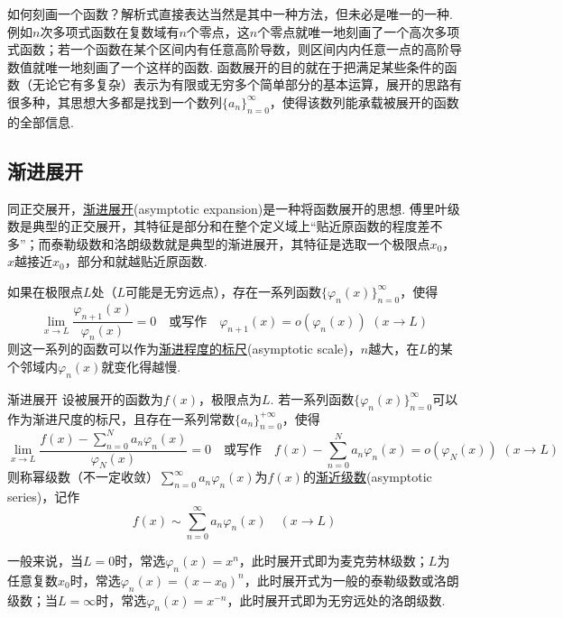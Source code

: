 \documentclass[main.tex]{subfiles}
\begin{document}
如何刻画一个函数？解析式直接表达当然是其中一种方法，但未必是唯一的一种. 例如\(n\)次多项式函数在复数域有\(n\)个零点，这\(n\)个零点就唯一地刻画了一个高次多项式函数；若一个函数在某个区间内有任意高阶导数，则区间内内任意一点的高阶导数值就唯一地刻画了一个这样的函数. 函数展开的目的就在于把满足某些条件的函数（无论它有多复杂）表示为有限或无穷多个简单部分的基本运算，展开的思路有很多种，其思想大多都是找到一个数列\(\{a_n\}_{n=0}^{\infty}\)，使得该数列能承载被展开的函数的全部信息.


\subsection{渐进展开}

同正交展开，\uline{渐进展开}(asymptotic expansion)是一种将函数展开的思想. 傅里叶级数是典型的正交展开，其特征是部分和在整个定义域上“贴近原函数的程度差不多”；而泰勒级数和洛朗级数就是典型的渐进展开，其特征是选取一个极限点\(x_0\)，\(x\)越接近\(x_0\)，部分和就越贴近原函数. 

如果在极限点\(L\)处（\(L\)可能是无穷远点），存在一系列函数\(\{\varphi_n(x)\}_{n=0}^{\infty}\)，使得
\[\lim_{x \to L} \frac{\varphi_{n+1}(x)}{\varphi_n(x)} = 0 \quad \mbox{或写作} \quad \varphi_{n+1}(x)=o(\varphi_n(x)) \,\, (x \to L)\]
则这一系列的函数可以作为\uline{渐进程度的标尺}(asymptotic scale)，\(n\)越大，在\(L\)的某个邻域内\(\varphi_n(x)\)就变化得越慢. 

\begin{definition}{渐进展开}
    设被展开的函数为\(f(x)\)，极限点为\(L\). 若一系列函数\(\{\varphi_n(x)\}_{n=0}^{\infty}\)可以作为渐进尺度的标尺，且存在一系列常数\(\{a_n\}_{n=0}^{+\infty}\)，使得
    \[\lim_{x \to L} \frac{f(x) - \displaystyle{\sum_{n=0}^{N}a_n\varphi_n(x)}}{\varphi_N(x)} = 0 \quad \mbox{或写作} \quad f(x) - \sum_{n=0}^{N}a_n\varphi_n(x) = o(\varphi_N(x)) \,\, (x \to L)\]
    则称幂级数（不一定收敛）\(\displaystyle{\sum_{n=0}^{\infty}a_n\varphi_n(x)}\)为\(f(x)\)的\uline{渐近级数}(asymptotic series)，记作
    \[f(x) \sim \sum_{n=0}^{\infty}a_n\varphi_n(x) \quad (x \to L)\]
\end{definition}

一般来说，当\(L=0\)时，常选\(\varphi_n(x)=x^n\)，此时展开式即为麦克劳林级数；\(L\)为任意复数\(x_0\)时，常选\(\varphi_n(x) = (x-x_0)^n\)，此时展开式为一般的泰勒级数或洛朗级数；当\(L=\infty\)时，常选\(\varphi_n(x)=x^{-n}\)，此时展开式即为无穷远处的洛朗级数.
\end{document}
